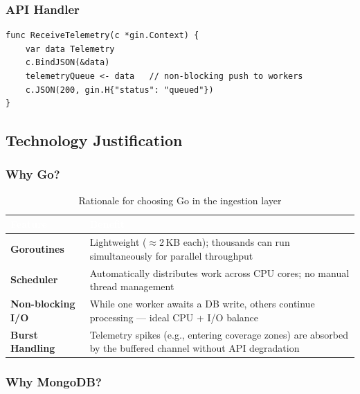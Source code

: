 \documentclass[11pt, a4paper]{article}
\begin{document}
\subsubsection{API Handler}

\begin{lstlisting}[style=gostyle, caption={Gin HTTP Handler}]
func ReceiveTelemetry(c *gin.Context) {
    var data Telemetry
    c.BindJSON(&data)
    telemetryQueue <- data   // non-blocking push to workers
    c.JSON(200, gin.H{"status": "queued"})
}
\end{lstlisting}

\subsection{Technology Justification}

\subsubsection{Why Go?}

\begin{table}[H]
\centering
\small
\begin{tabularx}{\linewidth}{>{\bfseries}p{3.2cm} X}
\toprule
\rowcolor{spaceblue}\textcolor{white}{\textbf{Feature}} & \textcolor{white}{\textbf{Benefit}} \\
\midrule
Goroutines & Lightweight ($\approx$2\,KB each); thousands can run simultaneously for parallel throughput \\
\midrule
Scheduler & Automatically distributes work across CPU cores; no manual thread management \\
\midrule
Non-blocking I/O & While one worker awaits a DB write, others continue processing --- ideal CPU + I/O balance \\
\midrule
Burst Handling & Telemetry spikes (e.g., entering coverage zones) are absorbed by the buffered channel without API degradation \\
\bottomrule
\end{tabularx}
\caption{Rationale for choosing Go in the ingestion layer}
\end{table}

\subsubsection{Why MongoDB?}
\end{document}
